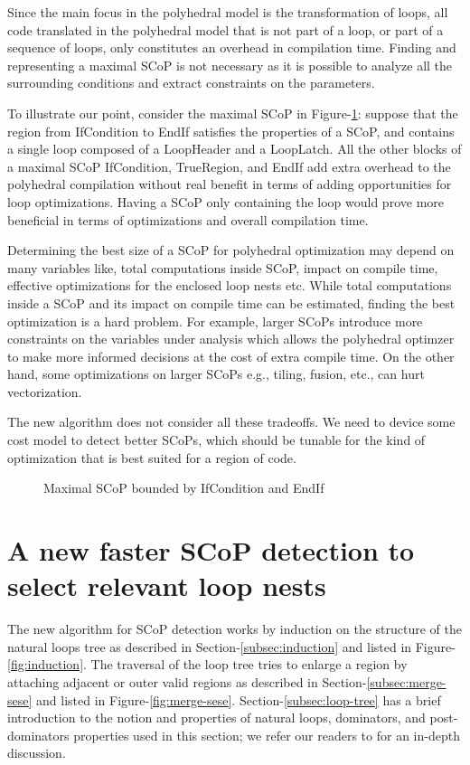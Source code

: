 \documentclass{sig-alternate}
\begin{document}
Since the main focus in the polyhedral model is the transformation of loops, all
code translated in the polyhedral model that is not part of a loop, or part of a
sequence of loops, only constitutes an overhead in compilation time.  Finding and
representing a maximal SCoP is not necessary as it is possible to analyze all
the surrounding conditions and extract constraints on the parameters.

To illustrate our point, consider the maximal SCoP in
Figure-\ref{fig:maximality}: suppose that the region from IfCondition to EndIf
satisfies the properties of a SCoP, and contains a single loop composed of a
LoopHeader and a LoopLatch.  All the other blocks of a maximal SCoP
IfCondition, TrueRegion, and EndIf add extra overhead to the polyhedral
compilation without real benefit in terms of adding opportunities for loop
optimizations.  Having a SCoP only containing the loop would prove more
beneficial in terms of optimizations and overall compilation time.

Determining the best size of a SCoP for polyhedral optimization
may depend on many variables like, total computations inside SCoP,
impact on compile time, effective optimizations for the enclosed loop nests etc.
While total computations inside a SCoP and its impact on compile time can be
estimated, finding the best optimization is a hard problem. For example,
larger SCoPs introduce more constraints on the variables under analysis
which allows the polyhedral optimzer to make more informed decisions at
the cost of extra compile time. On the other hand, some optimizations on larger
SCoPs e.g., tiling, fusion, etc., can hurt vectorization.

The new algorithm does not consider all these tradeoffs. We need to device
some cost model to detect better SCoPs, which should be tunable for
the kind of optimization that is best suited for a region of code.


\begin{figure}
\centering
\caption{Maximal SCoP bounded by IfCondition and EndIf}
\label{fig:maximality}
\end{figure}

\section{A new faster SCoP detection to select relevant loop nests}
\label{sec:new-SCoP-detection}
The new algorithm for SCoP detection works by induction on the structure of the
natural loops tree as described in Section-\ref{subsec:induction} and listed in
Figure-\ref{fig:induction}.  The traversal of the loop tree tries to enlarge a
region by attaching adjacent or outer valid regions as described in
Section-\ref{subsec:merge-sese} and listed in Figure-\ref{fig:merge-sese}.
Section-\ref{subsec:loop-tree} has a brief introduction to the notion and
properties of natural loops, dominators, and post-dominators properties used in
this section; we refer our readers to \cite{ramalingam} for an in-depth
discussion.
\end{document}
